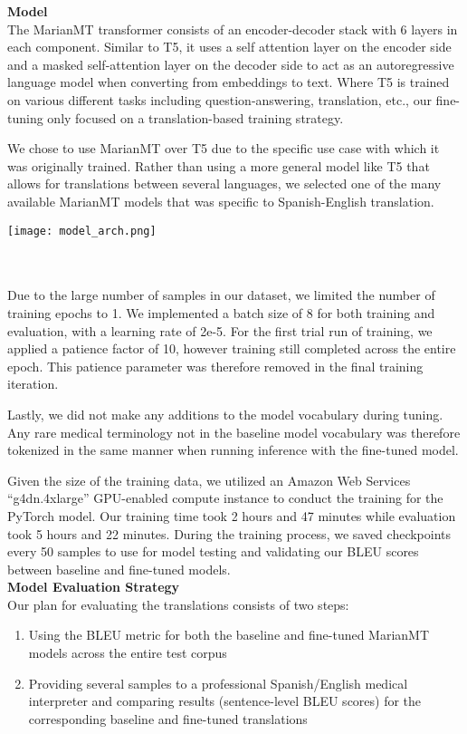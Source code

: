 \documentclass{article}
\begin{document}
\begin{multicols}{2}
\textbf{Model}\\
The MarianMT transformer consists of an encoder-decoder stack with 6 layers in each component. Similar to T5, it uses a self attention layer on the encoder side and a masked self-attention layer on the decoder side to act as an autoregressive language model when converting from embeddings to text. Where T5 is trained on various different tasks including question-answering, translation, etc., our fine-tuning only focused on a translation-based training strategy. 

We chose to use MarianMT over T5 due to the specific use case with which it was originally trained. Rather than using a more general model like T5 that allows for translations between several languages, we selected one of the many available MarianMT models that was specific to Spanish-English translation. 


\columnbreak

\begingroup
\texttt{[image: model\_arch.png]}
\caption{Figure 2: \small{Transformer Architecture}}
\label{\small{fig:figure2}}
\endgroup
\\
\\
Due to the large number of samples in our dataset, we limited the number of training epochs to 1. We implemented a batch size of 8 for both training and evaluation, with a learning rate of 2e-5. For the first trial run of training, we applied  a patience factor of 10, however training still completed across the entire epoch. This patience parameter was therefore removed in the final training iteration. 

Lastly, we did not make any additions to the model vocabulary during tuning. Any rare medical terminology not in the baseline model vocabulary was therefore tokenized in the same manner when running inference with the fine-tuned model.

Given the size of the training data, we utilized an Amazon Web Services “g4dn.4xlarge” GPU-enabled compute instance to conduct the training for the PyTorch model. Our training time took 2 hours and 47 minutes while evaluation took 5 hours and 22 minutes. During the training process, we saved checkpoints every 50 samples to use for model testing and validating our BLEU scores between baseline and fine-tuned models. \\


\textbf{Model Evaluation Strategy}\\
Our plan for evaluating the translations consists of two steps:
\begin{enumerate}
    \item Using the BLEU metric for both the baseline and fine-tuned MarianMT models across the entire test corpus
    \item Providing several samples to a professional Spanish/English medical interpreter and comparing results (sentence-level BLEU scores) for the corresponding baseline and fine-tuned translations
\end{enumerate}


\end{multicols}
\end{document}
